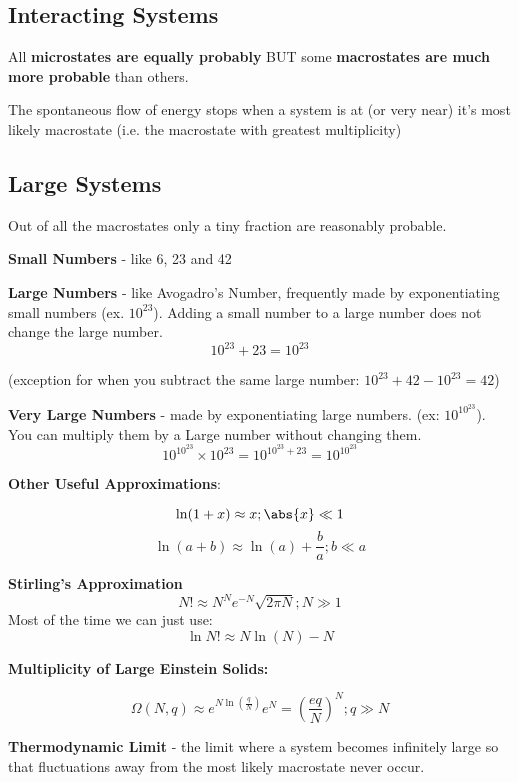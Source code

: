 \documentclass[11pt]{article}
\theoremstyle{definition}
\begin{document}
\subsection{Interacting Systems}

 All \textbf{microstates are equally probably} BUT some \textbf{macrostates are much more probable} than others.
 
 The spontaneous flow of energy stops when a system is at (or very near) it's most likely macrostate (i.e. the macrostate with greatest multiplicity)
 
 \subsection{Large Systems}
 
 Out of all the macrostates only a tiny fraction are reasonably probable.

\textbf{Small Numbers} - like 6, 23 and 42

\textbf{Large Numbers} - like Avogadro's Number, frequently made by exponentiating small numbers (ex. $10^{23}$). Adding a small number to a large number does not change the large number.\\
\[10^{23} +23 = 10^{23} \]

(exception for when you subtract the same large number: $10^{23} + 42 - 10^{23} = 42$)

\textbf{Very Large Numbers} - made by exponentiating large numbers.
(ex: $10^{10^{23}}$). You can multiply them by a Large number without changing them.
\[10^{10^{23}} \times 10^{23} = 10^{10^{23}+23} =10^{10^{23}} \]

\textbf{Other Useful Approximations}:

\[\ln(1+x) \approx x ; \abs{x} \ll 1\]
\[\ln(a+b) \approx \ln(a) + \frac{b}{a} ; b\ll a \]

\begin{shaded}
\textbf{Stirling's Approximation}
\begin{equation}
N! \approx N^Ne^{-N} \sqrt{2\pi N} ; N \gg 1
\end{equation}
Most of the time we can just use: 
\[\ln{N!} \approx N\ln(N) - N\]
\end{shaded}
\newpage 

\textbf{Multiplicity of Large Einstein Solids:}

\[ \Omega (N,q) \approx e^{N\ln\left(\frac{q}{N}\right)} e^N = \left(\frac{eq}{N}\right)^N ; q \gg N \]

\textbf{Thermodynamic Limit} - the limit where a system becomes infinitely large so that fluctuations away from the most likely macrostate never occur.
\end{document}
